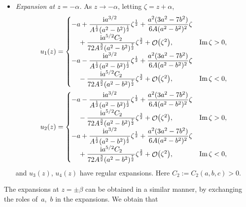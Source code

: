 \documentclass[pdftex]{sigma}
\DeclareMathOperator{\OO}{\mathcal{O}}
\numberwithin{equation}{section}
\begin{document}
\begin{itemize}
 \item \textit{Expansion at $z= - \alpha$.}
 As $z\to -\alpha$, letting $\zeta = z+\alpha$,
 \begin{align*}
 &u_1(z)=
 \begin{cases}
 -a +\dfrac{{\rm i}a^{3/2}}{A^{\frac{1}{2}}(a^2-b^2)^{\frac{1}{2}}}\zeta^{\frac{1}{2}} + \dfrac{a^2(3a^2-7b^2)}{6A(a^2-b^2)^2} \zeta &\\
 \quad{} + \dfrac{{\rm i}a^{5/2}C_2}{72A^{\frac{3}{2}}(a^2-b^2)^{\frac{7}{2}}}\zeta^{\frac{3}{2}} + \OO\bigl(\zeta^2\bigr), & \operatorname{Im} \zeta >0,\\[2mm]
 -a -\dfrac{{\rm i}a^{3/2}}{A^{\frac{1}{2}}(a^2-b^2)^{\frac{1}{2}}}\zeta^{\frac{1}{2}} + \dfrac{a^2(3a^2-7b^2)}{6A(a^2-b^2)^2} \zeta &\\
 \quad{} - \dfrac{{\rm i}a^{5/2}C_2}{72A^{\frac{3}{2}}(a^2-b^2)^{\frac{7}{2}}}\zeta^{\frac{3}{2}} + \OO\bigl(\zeta^2\bigr), &\operatorname{Im} \zeta <0,
 \end{cases}\\
 &u_2(z)=
 \begin{cases}
 -a -\dfrac{{\rm i}a^{3/2}}{A^{\frac{1}{2}}(a^2-b^2)^{\frac{1}{2}}}\zeta^{\frac{1}{2}} + \dfrac{a^2(3a^2-7b^2)}{6A(a^2-b^2)^2} \zeta &\\
 \quad{} - \dfrac{{\rm i}a^{5/2}C_2}{72A^{\frac{3}{2}}(a^2-b^2)^{\frac{7}{2}}}\zeta^{\frac{3}{2}} + \OO\bigl(\zeta^2\bigr), & \operatorname{Im} \zeta >0,\\[2mm]
 -a +\dfrac{{\rm i}a^{3/2}}{A^{\frac{1}{2}}(a^2-b^2)^{\frac{1}{2}}}\zeta^{\frac{1}{2}} + \dfrac{a^2(3a^2-7b^2)}{6A(a^2-b^2)^2} \zeta & \\
 \quad{}+ \dfrac{{\rm i}a^{5/2}C_2}{72A^{\frac{3}{2}}(a^2-b^2)^{\frac{7}{2}}}\zeta^{\frac{3}{2}} + \OO\bigl(\zeta^2\bigr), &\operatorname{Im}\zeta <0,
 \end{cases}
 \end{align*}
 and $u_3(z)$, $u_4(z)$ have regular expansions. Here
$C_2:=C_2(a,b,c)>0$.
 \end{itemize}
 The expansions at $z=\pm \beta$ can be obtained in a similar manner, by exchanging the roles of~$a$,~$b$ in the expansions. We obtain that
\end{document}

